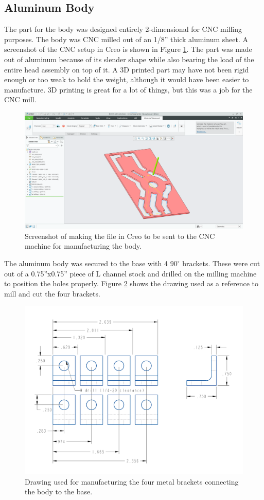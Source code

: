 \subsection{Aluminum Body}
The part for the body was designed entirely 2-dimensional for CNC milling purposes. The body was CNC milled out of an 1/8'' thick aluminum sheet. A screenshot of the CNC setup in Creo is shown in Figure \ref{fig:mfg}. The part was made out of aluminum because of its slender shape while also bearing the load of the entire head assembly on top of it. A 3D printed part may have not been rigid enough or too weak to hold the weight, although it would have been easier to manufacture. 3D printing is great for a lot of things, but this was a job for the CNC mill.
\begin{figure}[h]
    \centering
    \includegraphics[width=0.6\linewidth]{Thesis/ch3/mfg.png}
    \caption{Screenshot of making the file in Creo to be sent to the CNC machine for manufacturing the body.}
    \label{fig:mfg}
\end{figure}
The aluminum body was secured to the base with 4 $90^\circ$ brackets. These were cut out of a 0.75''x0.75'' piece of L channel stock and drilled on the milling machine to position the holes properly. Figure \ref{fig:bracket_drw} shows the drawing used as a reference to mill and cut the four brackets.

\begin{figure}[h]
    \centering
    \includegraphics[width=0.6\linewidth]{Thesis/ch3/bracket_drw2.pdf}
    \caption{Drawing used for manufacturing the four metal brackets connecting the body to the base.}
    \label{fig:bracket_drw}
\end{figure}


